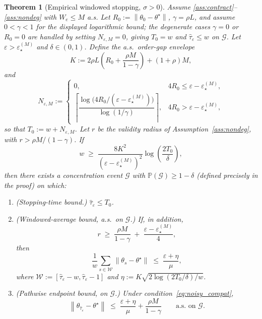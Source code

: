 \documentclass[12pt,a4paper]{article}
\newtheorem{theorem}[definition]{Theorem}
\newcommand{\norm}[1]{\left\lVert#1\right\rVert}
\begin{document}
\begin{theorem}[Empirical windowed stopping, $\sigma > 0$]
\label{thm:stopping_hp}
Assume \ref{ass:contract}--\ref{ass:nondeg} with $W_e \leq M$ a.s. Let
$R_0 := \norm{\theta_0 - \theta^\star}$, $\gamma = \rho L$, and assume
$0 < \gamma < 1$ for the displayed logarithmic bound; the degenerate
cases $\gamma = 0$ or $R_0 = 0$ are handled by setting $N_{\varepsilon,M}=0$,
giving $T_0 = w$ and $\hat\tau_\varepsilon \leq w$ on $\mathcal{G}$. Let
$\varepsilon > \varepsilon_\star^{(M)}$ and $\delta \in (0,1)$. Define
the a.s.\ order-gap envelope
\[
  K := 2\rho L \!\left(R_0 + \frac{\rho M}{1 - \gamma}\right) + (1+\rho)M,
\]
and
\[
N_{\varepsilon,M} :=
\begin{cases}
0, & 4R_0 \leq \varepsilon - \varepsilon_\star^{(M)},\\[4pt]
\left\lceil
  \dfrac{\log\!\bigl(4R_0/(\varepsilon-\varepsilon_\star^{(M)})\bigr)}
       {\log(1/\gamma)}
\right\rceil, & 4R_0 > \varepsilon - \varepsilon_\star^{(M)},
\end{cases}
\]
so that $T_0 := w + N_{\varepsilon,M}$.
Let $r$ be the validity radius of Assumption~\ref{ass:nondeg}, with
$r > \rho M/(1-\gamma)$.
If
\begin{equation}
\label{eq:w_condition}
w \;\geq\;
\frac{8 K^2}{(\varepsilon - \varepsilon_\star^{(M)})^2}
\log\!\left(\frac{2 T_0}{\delta}\right),
\end{equation}
then there exists a concentration event $\mathcal{G}$ with
$\mathbb{P}(\mathcal{G}) \geq 1 - \delta$ (defined precisely in the proof)
on which:
\begin{enumerate}
\item[(i)] \textnormal{(Stopping-time bound.)} $\hat\tau_\varepsilon \leq T_0$.

\item[(ii)] \textnormal{(Windowed-average bound, a.s.\ on $\mathcal{G}$.)}
If, in addition,
\begin{equation}
\label{eq:noisy_compat}
  r \;\geq\; \frac{\rho M}{1-\gamma} \;+\; \frac{\varepsilon - \varepsilon_\star^{(M)}}{4},
\end{equation}
then
\[
  \frac{1}{w}\sum_{s \in \mathcal{W}} \norm{\theta_s - \theta^\star}
  \;\leq\; \frac{\varepsilon + \eta}{\mu},
\]
where $\mathcal{W} := [\hat\tau_\varepsilon - w, \hat\tau_\varepsilon - 1]$
and $\eta := K\sqrt{2 \log(2 T_0 / \delta) / w}$.

\item[(iii)] \textnormal{(Pathwise endpoint bound, on $\mathcal{G}$.)} Under
condition~\eqref{eq:noisy_compat},
\[
  \norm{\theta_{\hat\tau_\varepsilon} - \theta^\star}
  \;\leq\; \frac{\varepsilon + \eta}{\mu} + \frac{\rho M}{1 - \gamma}
  \qquad \text{a.s.\ on } \mathcal{G}.
\]
\end{enumerate}
\end{theorem}
\end{document}
